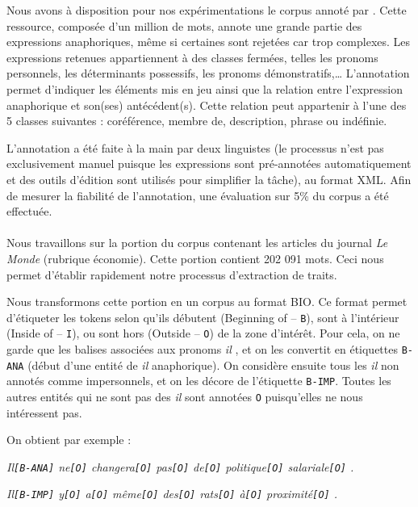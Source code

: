 \documentclass[a4paper,12pt]{article}
\begin{document}
Nous avons à disposition pour nos expérimentations le corpus annoté par \citet{tutin-hal-00373327}.
Cette ressource, composée d'un million de mots, annote une grande partie des expressions anaphoriques, même si certaines sont rejetées car trop complexes. Les expressions retenues appartiennent à des classes fermées, telles les pronoms personnels, les déterminants possessifs, les pronoms démonstratifs,\ldots
L'annotation permet d'indiquer les éléments mis en jeu ainsi que la relation entre l'expression anaphorique et son(ses) antécédent(s). Cette relation peut appartenir à l'une des 5 classes suivantes : coréférence, membre de, description, phrase ou indéfinie.

L'annotation a été faite à la main par deux linguistes (le processus n'est pas exclusivement manuel puisque les expressions sont pré-annotées automatiquement et des outils d'édition sont utilisés pour simplifier la tâche), au format XML. Afin de mesurer la fiabilité de l'annotation, une évaluation sur 5\% du corpus a été effectuée.

\paragraph{}
Nous travaillons sur la portion du corpus contenant les articles du journal \emph{Le Monde} (rubrique économie). Cette portion contient 202 091 mots. Ceci nous permet d'établir rapidement notre processus d'extraction de traits.


Nous transformons cette portion en un corpus au format BIO. Ce format permet d'étiqueter les tokens selon qu'ils débutent (Beginning of -- \verb!B!), sont à l'intérieur (Inside of -- \verb!I!), ou sont hors (Outside -- \verb!O!) de la zone d'intérêt.
Pour cela, on ne garde que les balises associées aux pronoms \og \textit{il} \fg{}, et on les convertit en étiquettes \verb!B-ANA! (début d'une entité de \og \textit{il} \fg{} anaphorique). On considère ensuite tous les \og \textit{il} \fg{} non annotés comme impersonnels, et on les décore de l'étiquette \verb!B-IMP!. Toutes les autres entités qui ne sont pas des \og \textit{il} \fg{} sont annotées \verb!O! puisqu'elles ne nous intéressent pas.
\label{annotation-imp}

On obtient par exemple :

\textit{Il\verb![B-ANA]! ne\verb![O]! changera\verb![O]! pas\verb![O]! de\verb![O]! politique\verb![O]! salariale\verb![O]! .}

\textit{Il\verb![B-IMP]! y\verb![O]! a\verb![O]! même\verb![O]! des\verb![O]! rats\verb![O]! à\verb![O]! proximité\verb![O]! .}
\end{document}
